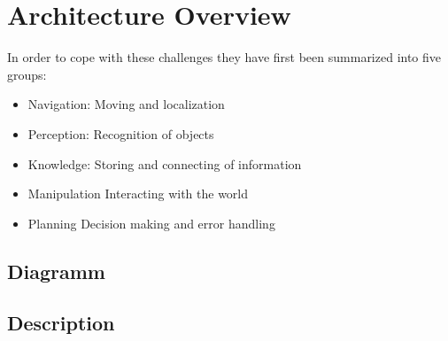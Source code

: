 \documentclass[main.tex]{subfiles}
\begin{document}
	\begingroup

	\renewcommand{\cleardoublepage}{}

	\renewcommand{\clearpage}{}

	\chapter{Architecture Overview}
		In order to cope with these challenges they have first been summarized into five groups:
		\begin{itemize}
			\item Navigation: Moving and localization
			\item Perception: Recognition of objects
			\item Knowledge: Storing and connecting of information
			\item Manipulation Interacting with the world
			\item Planning Decision making and error handling  
		\end{itemize}

		\chapterauthor{}
		
		\section{Diagramm}
		
		
		\section{Description}
	  		 

	\endgroup
\end{document}
